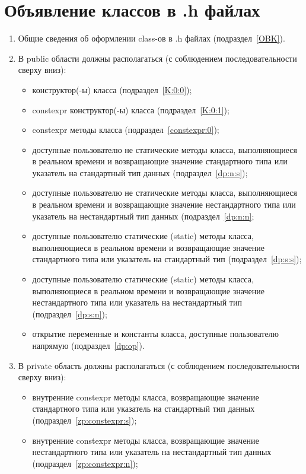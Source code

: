 \section{Объявление классов в .h файлах}\label{class:0}
\begin{enumerate}
	\item Общие сведения об оформлении class-ов в .h файлах (подраздел~\ref{OBK}).
	\item В public области должны располагаться (с соблюдением последовательности сверху вниз):\begin{itemize}
		\item конструктор(-ы) класса (подраздел~\ref{K:0:0});
		\item constexpr конструктор(-ы) класса (подраздел~\ref{K:0:1});
		\item constexpr методы класса (подраздел~\ref{constexpr:0});
		\item доступные пользователю не статические методы класса, выполняющиеся в реальном времени и возвращающие значение стандартного типа или указатель на стандартный тип данных (подраздел~\ref{dp:n:s});
		\item доступные пользователю не статические методы класса, выполняющиеся в реальном времени и возвращающие значение нестандартного типа или указатель на нестандартный тип данных (подраздел~\ref{dp:n:n};
		\item доступные пользователю статические (static) методы класса, выполняющиеся в реальном времени и возвращающие значение стандартного типа или указатель на стандартный тип (подраздел~\ref{dp:s:s});
		\item доступные пользователю статические (static) методы класса, выполняющиеся в реальном времени и возвращающие значение нестандартного типа или указатель на нестандартный тип (подраздел~\ref{dp:s:n});
		\item открытие переменные и константы класса, доступные пользователю напрямую (подраздел~\ref{dp:op}).
	\end{itemize}
	\item В private область должны располагаться (с соблюдением последовательности сверху вниз):\begin{itemize}
		\item внутренние constexpr методы класса, возвращающие значение стандартного типа или указатель на стандартный тип данных (подраздел~\ref{zp:constexpr:s});
		\item внутренние constexpr методы класса, возвращающие значение нестандартного типа или указатель на нестандартный тип данных (подраздел~\ref{zp:constexpr:n});

\end{itemize}
\end{enumerate}
